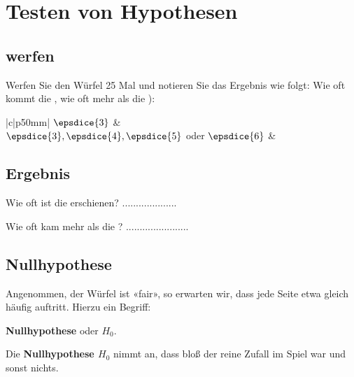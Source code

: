 
\renewcommand{\bbwAufgabenBlockID}{StHyp}

\renewcommand{\metaHeaderLine}{Auftrag: Würfelexperiment}
\renewcommand{\arbeitsblattTitel}{Hypothesentest}


\arbeitsblattHeader{}

\section{Testen von Hypothesen}

\subsection{ werfen}

Werfen Sie den Würfel 25 Mal und notieren Sie das Ergebnis wie folgt: Wie oft kommt die , wie oft
mehr als die ):

\begin{bbwFillInTabular}{|c|p{50mm}|}\hline
$\epsdice{3}$ & \\\hline
$\epsdice{3},\epsdice{4},\epsdice{5}$ oder $\epsdice{6}$ & \\\hline
\end{bbwFillInTabular}

\subsection{Ergebnis}

Wie oft ist die  erschienen? ....................
\vspace{15mm}

Wie oft kam mehr als die ? .......................

\newpage


\subsection{Nullhypothese}
Angenommen, der Würfel ist «fair», so erwarten wir, dass jede Seite
etwa gleich häufig auftritt. Hierzu ein Begriff:

\begin{center}\textbf{Nullhypothese} oder {$H_0$}.\end{center}

Die \textbf{Nullhypothese $H_0$} nimmt an, dass bloß der reine Zufall
im Spiel war und sonst nichts.

